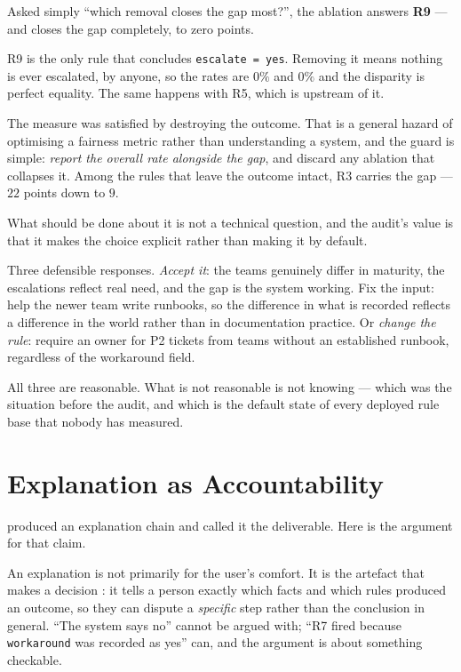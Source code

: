 \begin{alertbox}
Asked simply ``which removal closes the gap most?'', the ablation answers
\textbf{R9} --- and closes the gap completely, to zero points.

R9 is the only rule that concludes \texttt{escalate = yes}. Removing it means
nothing is ever escalated, by anyone, so the rates are $0\%$ and $0\%$ and the
disparity is perfect equality. The same happens with R5, which is upstream of it.

The measure was satisfied by destroying the outcome. That is a general hazard of
optimising a fairness metric rather than understanding a system, and the guard is
simple: \emph{report the overall rate alongside the gap}, and discard any ablation
that collapses it. Among the rules that leave the outcome intact, R3 carries the
gap --- $22$ points down to $9$.
\end{alertbox}

\begin{conceptbox}
What should be done about it is not a technical question, and the audit's value is
that it makes the choice explicit rather than making it by default.

Three defensible responses. \emph{Accept it}: the teams genuinely differ in
maturity, the escalations reflect real need, and the gap is the system working. Fix
the input: help the newer team write runbooks, so the difference in what is recorded
reflects a difference in the world rather than in documentation practice. Or
\emph{change the rule}: require an owner for P2 tickets from teams without an
established runbook, regardless of the workaround field.

All three are reasonable. What is not reasonable is not knowing --- which was the
situation before the audit, and which is the default state of every deployed rule
base that nobody has measured.
\end{conceptbox}

\section{Explanation as Accountability}

 produced an explanation chain and called it the deliverable. Here is
the argument for that claim.

An explanation is not primarily for the user's comfort. It is the artefact that
makes a decision : it tells a person exactly which facts and which
rules produced an outcome, so they can dispute a \emph{specific} step rather than
the conclusion in general. ``The system says no'' cannot be argued with; ``R7 fired
because \texttt{workaround} was recorded as yes'' can, and the argument is about
something checkable.

